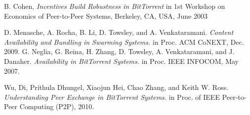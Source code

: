 \documentclass[conference]{IEEEtran}
\begin{document}
	\begin{thebibliography}{10}
		
		B. Cohen, \emph{Incentives Build Robustness in BitTorrent} in 1st Workshop
		on Economics of Peer-to-Peer Systems, Berkeley, CA, USA, June 2003
		
		D. Menasche, A. Rocha, B. Li, D. Towsley, and A. Venkataramani.  \emph{Content Availability and Bundling in Swarming Systems.} in Proc. ACM CoNEXT, Dec. 2009.
		G. Neglia, G. Reina, H. Zhang, D. Towsley, A. Venkataramani, and J. Danaher. \emph{Availability in BitTorrent Systems.} in Proc. IEEE INFOCOM, May 2007.
		
		Wu, Di, Prithula Dhungel, Xiaojun Hei, Chao Zhang, and Keith W. Ross. \emph{Understanding Peer Exchange in BitTorrent Systems.} in Proc. of IEEE Peer-to-Peer Computing (P2P), 2010.
		
	\end{thebibliography}
	
	
\end{document}
